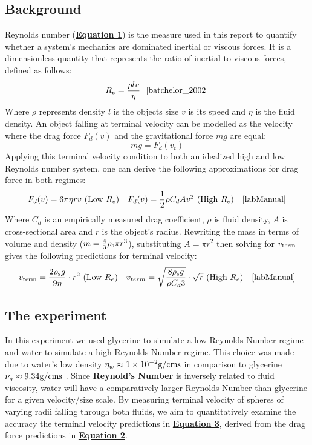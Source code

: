 \documentclass[
	letterpaper
	12pt
]{template}
\newcommand{\bref}[2]{\textbf{\hyperref[#1]{#2}}}
\begin{document}
\subsection{Background}
Reynolds number (\bref{eqn::reynolds}{Equation 1}) is the measure used in this report to quantify whether a system's mechanics are dominated inertial or viscous forces. It is a dimensionless quantity that represents the ratio of inertial to viscous forces, defined as follows:
\begin{equation}\label{eqn::reynolds}
	R_e = \frac{\rho l v}{\eta}\ \ \text{\cite{batchelor_2002}}
\end{equation}
Where $\rho$ represents density $l$ is the objects size $v$ is its speed and $\eta$ is the fluid density. An object falling at terminal velocity can be modelled as the velocity where the drag force $F_d(v)$ and the gravitational force $mg$ are equal:
\[mg = F_d(v_{t})\]
Applying this terminal velocity condition to both an idealized high and low Reynolds number system, one can derive the following approximations for drag force in both regimes:
\begin{align}\label{eqn::dragForce}
	F_d(v) = 6\pi\eta r v \text{ (Low $R_e$)} && F_d(v) = {1\over 2}\rho C_dAv^2 \text{ (High $R_e$)} && \cite{labManual}
\end{align}
Where $C_d$ is an empirically measured drag coefficient, $\rho$ is fluid density, $A$ is cross-sectional area and $r$ is the object's radius. Rewriting the mass in terms of volume and density ($m =  {4\over 3}\rho_{\rm s}\pi r^3$), substituting $A=\pi r^2$ then solving for $v_{\rm term}$ gives the following predictions for terminal velocity:
\begin{align}\label{eqn::terminalVelocity}
	v_{\rm term}  = {2\rho_{\rm s} g\over 9 \eta}\cdot r^2 \text{ (Low $R_e$)} && 	v_{term} =\sqrt{8\rho_{\rm s} g\over \rho C_d  3}\cdot \sqrt{r} \text{ (High $R_e$)}
	&& \cite{labManual}
\end{align}

\subsection{The experiment}
In this experiment we used glycerine to simulate a low Reynolds Number regime and water to simulate a high Reynolds Number regime. This choice was made due to water's low density $\eta_{w} \approx 1\times10^{-2}\unit{g\per {\cm\second}}$ in comparison to glycerine $\nu_g \approx 9.34\unit{g\per {\cm\second}}$ \cite{labManual}. Since \bref{eqn::reynolds}{Reynold's Number} is inversely related to fluid viscosity, water will have a comparatively larger Reynolds Number than  glycerine for a given velocity/size scale. By measuring terminal velocity of spheres of varying radii falling through both fluids, we aim to quantitatively examine the accuracy the terminal velocity predictions in \bref{eqn::terminalVelocity}{Equation 3}, derived from the drag force predictions in \bref{eqn::dragForce}{Equation 2}.
\end{document}
